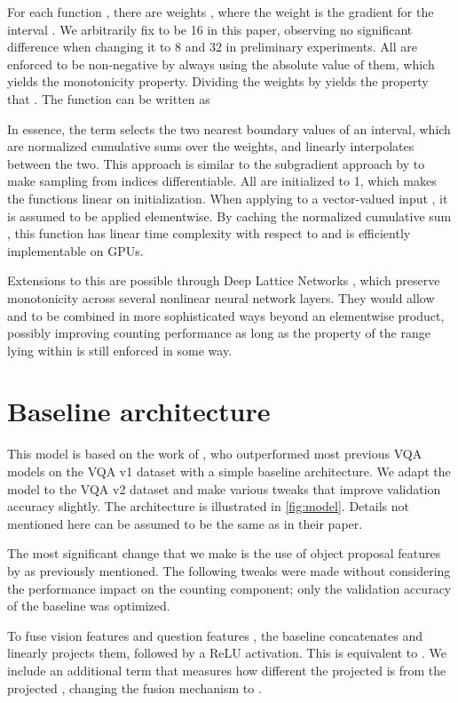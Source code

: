 \documentclass[letterpaper]{article}
\begin{document}
For each function , there are  weights , where the weight  is the gradient for the interval .
We arbitrarily fix  to be 16 in this paper, observing no significant difference when changing it to 8 and 32 in preliminary experiments.
All  are enforced to be non-negative by always using the absolute value of them, which yields the monotonicity property.
Dividing the weights by  yields the property that .
The function can be written as



In essence, the  term selects the two nearest boundary values of an interval, which are normalized cumulative sums over the  weights, and linearly interpolates between the two.
This approach is similar to the subgradient approach by \citet{Jaderberg2015a} to make sampling from indices differentiable.
All  are initialized to 1, which makes the functions linear on initialization.
When applying  to a vector-valued input , it is assumed to be applied elementwise.
By caching the normalized cumulative sum , this function has linear time complexity with respect to  and is efficiently implementable on GPUs.

Extensions to this are possible through Deep Lattice Networks \citep{You2017a}, which preserve monotonicity across several nonlinear neural network layers.
They would allow  and  to be combined in more sophisticated ways beyond an elementwise product, possibly improving counting performance as long as the property of the range lying within  is still enforced in some way.


\section{Baseline architecture}\label{app:arch}
This model is based on the work of \citet{Kazemi2017a}, who outperformed most previous VQA models on the VQA v1 dataset with a simple baseline architecture.
We adapt the model to the VQA v2 dataset and make various tweaks that improve validation accuracy slightly.
The architecture is illustrated in \autoref{fig:model}.
Details not mentioned here can be assumed to be the same as in their paper.

The most significant change that we make is the use of object proposal features by \citet{Anderson2017a} as previously mentioned.
The following tweaks were made without considering the performance impact on the counting component; only the validation accuracy of the baseline was optimized.

To fuse vision features  and question features , the baseline concatenates and linearly projects them, followed by a ReLU activation.
This is equivalent to .
We include an additional term that measures how different the projected  is from the projected , changing the fusion mechanism to .
\end{document}
